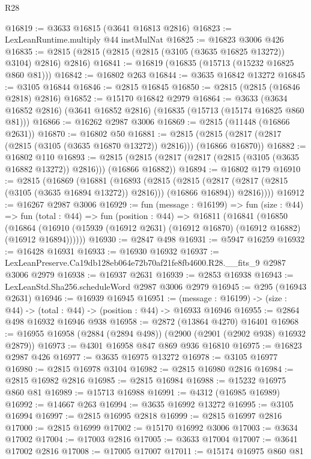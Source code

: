 \begin{lexlean}{R28}
\begin{coremodule}
@16819 := @3633 @16815 (@3641 @16813 @2816)
@16823 := LexLeanRuntime.multiply @44 instMulNat
@16825 := @16823 @3006 @426
@16835 := @2815 (@2815 (@2815 (@2815 (@3105 (@3635 @16825 @13272)) @3104) @2816) @2816)
@16841 := @16819 (@16835 (@15713 (@15232 @16825 @860 @81)))
@16842 := @16802 @263
@16844 := @3635 @16842 @13272
@16845 := @3105 @16844
@16846 := @2815 @16845
@16850 := @2815 (@2815 (@16846 @2818) @2816)
@16852 := @15170 @16842 @2979
@16864 := @3633 (@3634 @16852 @2816) (@3641 @16852 @2816) (@16835 (@15713 (@15174 @16825 @860 @81)))
@16866 := @16262 @2987 @3006
@16869 := @2815 (@11448 (@16866 @2631))
@16870 := @16802 @50
@16881 := @2815 (@2815 (@2817 (@2817 (@2815 (@3105 (@3635 @16870 @13272)) @2816))) (@16866 @16870))
@16882 := @16802 @110
@16893 := @2815 (@2815 (@2817 (@2817 (@2815 (@3105 (@3635 @16882 @13272)) @2816))) (@16866 @16882))
@16894 := @16802 @179
@16910 := @2815
    (@16869
      (@16881
        (@16893
          (@2815
            (@2815 (@2817 (@2817 (@2815 (@3105 (@3635 @16894 @13272)) @2816))) (@16866 @16894))
            @2816))))
@16912 := @16267 @2987 @3006
@16929 := fun (message : @16199) =>
  fun (size : @44) =>
  fun (total : @44) =>
  fun (position : @44) =>
  @16811
    (@16841
      (@16850
        (@16864 (@16910 (@15939 (@16912 @2631) (@16912 @16870) (@16912 @16882) (@16912 @16894))))))
@16930 := @2847 @498
@16931 := @5947 @16259
@16932 := @16428 @16931
@16933 := @16930 @16932
@16937 := LexLeanPreserve.Ca19db128eb064e72b70af21fe8fb4600.R28.__fits_9 @2987 @3006 @2979
@16938 := @16937 @2631
@16939 := @2853 @16938
@16943 := LexLeanStd.Sha256.scheduleWord @2987 @3006 @2979
@16945 := @295 (@16943 @2631)
@16946 := @16939 @16945
@16951 := (message : @16199) -> (size : @44) -> (total : @44) -> (position : @44) -> @16933 @16946
@16955 := @2864 @498 @16932 @16946 @938
@16958 := @2872 (@13864 @4270) @16401
@16968 := @16955 @16958 (@2884 (@2894 @498)) (@2900 (@2901 (@2902 @938) @16932 @2879))
@16973 := @4301 @16958 @847 @869 @936 @16810
@16975 := @16823 @2987 @426
@16977 := @3635 @16975 @13272
@16978 := @3105 @16977
@16980 := @2815 @16978 @3104
@16982 := @2815 @16980 @2816
@16984 := @2815 @16982 @2816
@16985 := @2815 @16984
@16988 := @15232 @16975 @860 @81
@16989 := @15713 @16988
@16991 := @4312 (@16985 @16989)
@16992 := @14667 @263
@16994 := @3635 @16992 @13272
@16995 := @3105 @16994
@16997 := @2815 @16995 @2818
@16999 := @2815 @16997 @2816
@17000 := @2815 @16999
@17002 := @15170 @16992 @3006
@17003 := @3634 @17002
@17004 := @17003 @2816
@17005 := @3633 @17004
@17007 := @3641 @17002 @2816
@17008 := @17005 @17007
@17011 := @15174 @16975 @860 @81

\end{coremodule}
\end{lexlean}
